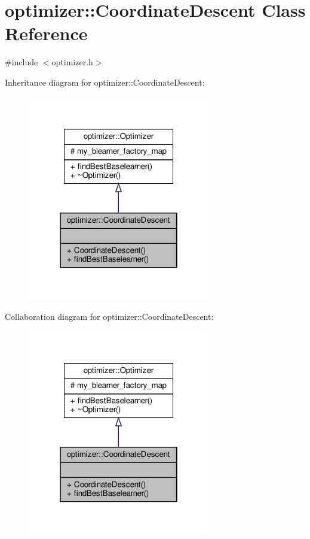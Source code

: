 \hypertarget{classoptimizer_1_1_coordinate_descent}{}\section{optimizer\+:\+:Coordinate\+Descent Class Reference}
\label{classoptimizer_1_1_coordinate_descent}


{\ttfamily \#include $<$optimizer.\+h$>$}



Inheritance diagram for optimizer\+:\+:Coordinate\+Descent\+:
\nopagebreak
\begin{figure}[H]
\begin{center}
\leavevmode
\includegraphics[width=226pt]{classoptimizer_1_1_coordinate_descent__inherit__graph}
\end{center}
\end{figure}


Collaboration diagram for optimizer\+:\+:Coordinate\+Descent\+:
\nopagebreak
\begin{figure}[H]
\begin{center}
\leavevmode
\includegraphics[width=226pt]{classoptimizer_1_1_coordinate_descent__coll__graph}
\end{center}
\end{figure}
